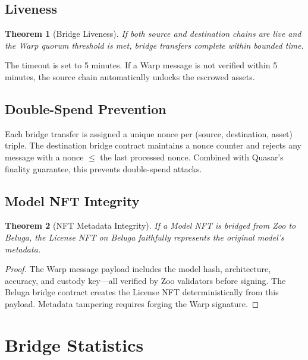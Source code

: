 \documentclass[11pt,letterpaper]{article}
\newtheorem{theorem}{Theorem}[section]
\begin{document}
\subsection{Liveness}

\begin{theorem}[Bridge Liveness]
If both source and destination chains are live and the Warp quorum threshold is met, bridge transfers complete within bounded time.
\end{theorem}

The timeout is set to 5 minutes. If a Warp message is not verified within 5 minutes, the source chain automatically unlocks the escrowed assets.

\subsection{Double-Spend Prevention}

Each bridge transfer is assigned a unique nonce per (source, destination, asset) triple. The destination bridge contract maintains a nonce counter and rejects any message with a nonce $\leq$ the last processed nonce. Combined with Quasar's finality guarantee, this prevents double-spend attacks.

\subsection{Model NFT Integrity}

\begin{theorem}[NFT Metadata Integrity]
If a Model NFT is bridged from Zoo to Beluga, the License NFT on Beluga faithfully represents the original model's metadata.
\end{theorem}

\begin{proof}
The Warp message payload includes the model hash, architecture, accuracy, and custody key---all verified by Zoo validators before signing. The Beluga bridge contract creates the License NFT deterministically from this payload. Metadata tampering requires forging the Warp signature.
\end{proof}

\section{Bridge Statistics}
\end{document}

